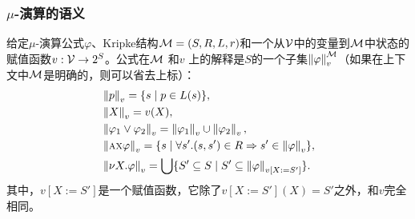 \documentclass[9pt, CJK]{beamer}
\begin{document}
\begin{frame}
	\frametitle{$\mu$-演算的语义}
	{\footnotesize
	\begin{definition}
		给定$\mu$-演算公式$\varphi$、Kripke结构${\cal M}=(S,R,L,r)$和一个从${\cal V}$中的变量到${\cal M}$中状态的赋值函数$v: {\cal V} \rightarrow 2^S$。公式在${\cal M}$ 和$v$ 上的解释是$S$的一个子集$\left\| \varphi\right\|_v^{{\cal M}}$（如果在上下文中${\cal M}$是明确的，则可以省去上标）：
		\begin{align*}
			& \left \| p\right \|_v = \{s\mid p \in L(s)\}, \\
			& \left\| X\right\|_v = v(X),\\
			& \left\|\varphi_1 \vee \varphi_2\right\|_v = \left\|\varphi_1\right\|_v \cup \left\|\varphi_2\right\|_v,\\
			& \left\|\textsc{a} \textsc{x} \varphi\right\|_v = \{s\mid \forall s'. (s, s') \in R \Rightarrow s' \in \left\|\varphi\right\|_v\},\\
			& \left\| \nu X. \varphi\right\|_v = \bigcup\{S' \subseteq S \mid S' \subseteq \left\|\varphi\right\|_{v[X:= S']}\}.
		\end{align*}
		其中，$v[X:= S']$是一个赋值函数，它除了$v[X:= S'](X)=S'$之外，和$v$完全相同。
	\end{definition}
}
\end{frame}
\end{document}

